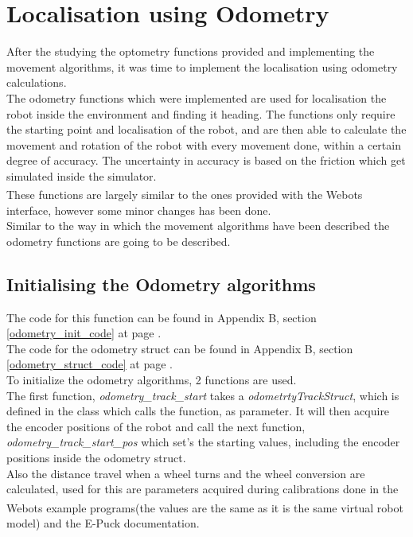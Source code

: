 \section{Localisation using Odometry}
After the studying the optometry functions provided and implementing the movement algorithms, it was time to implement the localisation using odometry calculations.\\
The odometry functions which were implemented are used for localisation the robot inside the environment and finding it heading. The functions only require the starting point and localisation of the robot, and are then able to calculate the movement and rotation of the robot with every movement done, within a certain degree of accuracy. The uncertainty in accuracy is based on the friction which get simulated inside the simulator. \\
These functions are largely similar to the ones provided with the Webots\textsuperscript{\texttrademark} interface, however some minor changes has been done. \\
Similar to the way in which the movement algorithms have been described the odometry functions are going to be described. 

\subsection{Initialising the Odometry algorithms}
\label{odometry_init_description}
The code for this function can be found in Appendix B, section \ref{odometry_init_code} at page \pageref{odometry_init_code}.\\
The code for the odometry struct can be found in Appendix B, section \ref{odometry_struct_code} at page \pageref{odometry_struct_code}.\\
To initialize the odometry algorithms, 2 functions are used. \\
The first function, \textit{odometry\_track\_start} takes a \textit{odometrtyTrackStruct}, which is defined in the class which calls the function, as parameter. It will then acquire the encoder positions of the robot and call the next function, \textit{odometry\_track\_start\_pos} which set's the starting values, including the encoder positions inside the odometry struct.\\[3ex]


Also the distance travel when a wheel turns and the wheel conversion are calculated, used for this are parameters acquired during calibrations done in the Webots \textsuperscript{\texttrademark} example programs(the values are the same as it is the same virtual robot model) and the E-Puck documentation. 

